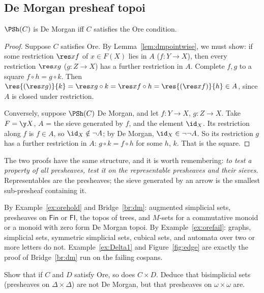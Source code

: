 \subsection{De Morgan presheaf topoi}

\begin{bridge}[De Morgan]\label{br:dm}
$\PSh(C)$ is De Morgan iff $C$ satisfies the Ore condition.
\end{bridge}

\begin{proof}
Suppose $C$ satisfies Ore. By Lemma~\ref{lem:dmpointwise}, we must show: if some restriction $\res xf$ of $x\in F(X)$ lies in $A$ ($f : Y\to X$), then every restriction $\res xg$ ($g : Z\to X$) has a further restriction in $A$. Complete $f,g$ to a square $f\circ h = g\circ k$. Then $\res{(\res xg)}{k} = \res x{g\circ k} = \res x{f\circ h} = \res{(\res xf)}{h}\in A$, since $A$ is closed under restriction.

Conversely, suppose $\PSh(C)$ De Morgan, and let $f : Y\to X$, $g : Z\to X$. Take $F = \y X$, $A$ = the sieve generated by $f$, and the element $\id_X$. Its restriction along $f$ is $f\in A$, so $\id_X\notin\neg A$; by De Morgan, $\id_X\in\neg\neg A$. So its restriction $g$ has a further restriction in $A$: $g\circ k = f\circ h$ for some $h$, $k$. That is the square.
\end{proof}

\begin{remark}
The two proofs have the same structure, and it is worth remembering: \emph{to test a property of all presheaves, test it on the representable presheaves and their sieves}. Representables are the  presheaves; the sieve generated by an arrow is the smallest sub-presheaf containing it.
\end{remark}

\begin{example}
By Example~\ref{ex:orehold} and Bridge~\ref{br:dm}: augmented simplicial sets, presheaves on $\mathsf{Fin}$ or $\mathsf{FI}$, the topos of trees, and $M$-sets for a commutative monoid or a monoid with zero form De Morgan topoi. By Example~\ref{ex:orefail}: graphs, simplicial sets, symmetric simplicial sets, cubical sets, and automata over two or more letters do not. Example~\ref{ex:Delta1} and Figure~\ref{fig:edge} are exactly the proof of Bridge~\ref{br:dm} run on the failing cospans.
\end{example}

\begin{exercise}\label{exo:oreproduct}
Show that if $C$ and $D$ satisfy Ore, so does $C\times D$. Deduce that bisimplicial sets (presheaves on $\Delta\times\Delta$) are not De Morgan, but that presheaves on $\omega\times\omega$ are.
\end{exercise}


